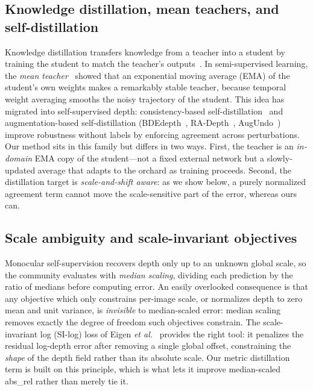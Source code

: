 \documentclass[conference]{IEEEtran}
\begin{document}
\subsection{Knowledge distillation, mean teachers, and self-distillation}
Knowledge distillation transfers knowledge from a teacher into a student by training
the student to match the teacher's outputs~\cite{hinton2015distillation}. In
semi-supervised learning, the \emph{mean teacher}~\cite{tarvainen2017meanteacher}
showed that an exponential moving average (EMA) of the student's own weights makes a
remarkably stable teacher, because temporal weight averaging smooths the noisy
trajectory of the student. This idea has migrated into self-supervised depth:
consistency-based self-distillation~\cite{ecdepth2023} and augmentation-based
self-distillation (BDEdepth~\cite{bdedepth2023}, RA-Depth~\cite{he2022radepth},
AugUndo~\cite{wu2024augundo}) improve robustness without labels by enforcing agreement
across perturbations. Our method sits in this family but differs in two ways. First,
the teacher is an \emph{in-domain} EMA copy of the student---not a fixed external
network but a slowly-updated average that adapts to the orchard as training proceeds.
Second, the distillation target is \emph{scale-and-shift aware}: as we show below, a
purely normalized agreement term cannot move the scale-sensitive part of the error,
whereas ours can.

\subsection{Scale ambiguity and scale-invariant objectives}
Monocular self-supervision recovers depth only up to an unknown global scale, so the
community evaluates with \emph{median scaling}, dividing each prediction by the ratio
of medians before computing error. An easily overlooked consequence is that any
objective which only constrains per-image scale, or normalizes depth to zero mean and
unit variance, is \emph{invisible} to median-scaled error: median scaling removes
exactly the degree of freedom such objectives constrain. The scale-invariant log
(SI-log) loss of Eigen \emph{et al.}~\cite{eigen2014depth} provides the right tool: it
penalizes the residual log-depth error after removing a single global offset,
constraining the \emph{shape} of the depth field rather than its absolute scale. Our
metric distillation term is built on this principle, which is what lets it improve
median-scaled abs\_rel rather than merely tie it.
\end{document}
